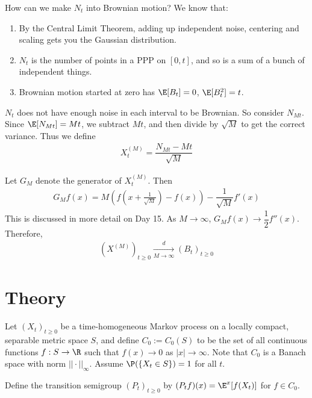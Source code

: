 \begin{exmp}{How can we make $N_t$ into Brownian motion?}
We know that:
\begin{enumerate}
\item By the Central Limit Theorem, adding up independent noise, centering and scaling gets you the Gaussian distribution. 
\item $N_t$ is the number of points in a PPP on $[0, t]$, and so is a sum of a bunch of independent things. 
\item Brownian motion started at zero has $\E[B_t] = 0$, $\E[B_t^2] = t$.
\end{enumerate}

$N_t$ does not have enough noise in each interval to be Brownian. So consider $N_{Mt}$. Since
$\E[N_{Mt}] = Mt$, we subtract $Mt$, and then divide by $\sqrt{M}$ to get the correct variance.
Thus we define
$$\begin{aligned}
X_t^{(M)} = \dfrac{ N_{Mt} - Mt}{\sqrt{M}}
\end{aligned}$$

Let $G_M$ denote the generator of $X_t^{(M)}$. Then
$$\begin{aligned}
G_M f(x) = M \left( f \left( x+ \frac{1}{\sqrt{M}}\right) - f(x) \right) - \dfrac{1}{\sqrt{M}} f'(x)
\end{aligned}$$
This is discussed in more detail on Day 15. 
As $M \to \infty$, $G_M f(x) \to \dfrac{1}{2} f''(x)$. 
Therefore, 
$$\begin{aligned}
(X^{(M)})_{t \geq 0} \xrightarrow[M \to \infty]{d} (B_t)_{t \geq 0}
\end{aligned}$$
\end{exmp}



\section{Theory}

Let $(X_t)_{t \geq 0}$ be a time-homogeneous Markov process on a locally compact, separable metric space $S$, 
and define
$C_0 := C_0(S)$ to be the set of all continuous functions $f: S \to \R$ such that $f(x) \to 0$ as $|x| \to \infty$. 
Note that $C_0$ is a Banach space with norm $|| \cdot ||_{\infty}$. Assume $\P(\{X_t \in S \}) = 1$ for all $t$. 

\begin{defn}
Define the transition semigroup $(P_t)_{t \geq 0}$ by $(P_t f)(x) = \E^{x}[f(X_t)]$ for $f \in C_0$. 
\end{defn}


